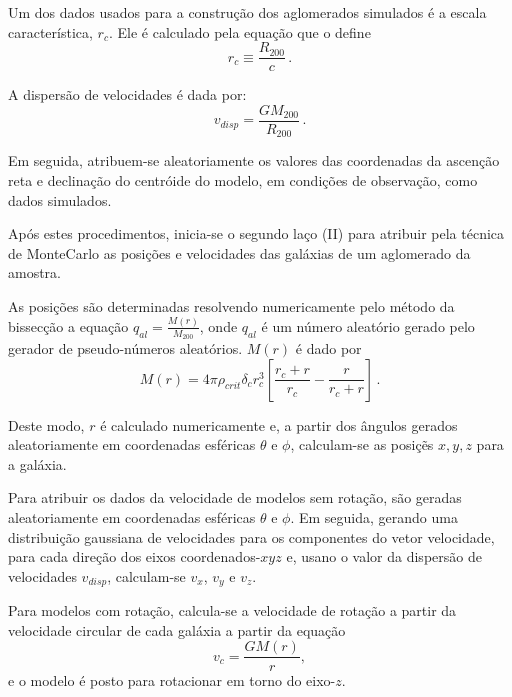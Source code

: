 Um dos dados usados para a constru\c c\~ao dos aglomerados simulados \'e a escala caracter\'istica, $r_c$. Ele \'e calculado pela equa\c c\~ao que o define
\begin{equation}
r_c \equiv \frac{R_{200}}{c} \, .
\label{rc}
\end{equation}	

A dispers\~ao de velocidades \'e dada por:
\begin{equation}
v_{disp} = \frac{GM_{200}}{R_{200}} \, .	
\label{vdisp}
\end{equation}
	
Em seguida, atribuem-se aleatoriamente os valores das coordenadas da ascen\c c\~ao reta e declina\c c\~ao do centr\'oide do modelo, em condi\c c\~oes de observa\c c\~ao, como dados simulados. 


Ap\'os estes procedimentos, inicia-se o segundo la\c co (II) para atribuir pela t\'ecnica de MonteCarlo as posi\c c\~oes e velocidades das gal\'axias de um aglomerado da amostra. 

As posi\c c\~oes s\~ao determinadas resolvendo numericamente pelo m\'etodo da bissec\c c\~ao a equa\c c\~ao $q_{al} = \frac{M(r)}{M_{200}}$, onde $q_{al}$ \'e um n\'umero aleat\'orio gerado pelo gerador de pseudo-n\'umeros aleat\'orios. $M(r)$ \'e dado por
\begin{equation}
M(r)= 4 \pi \rho_{crit} \delta_c r_c^3 \left[ \frac{r_c + r}{r_c} - \frac{r}{r_c+r}  \right] \, .
\label{nfw2}
\end{equation}

Deste modo, $r$ \'e calculado  numericamente e, a partir dos \^angulos gerados aleatoriamente em coordenadas esf\'ericas $\theta$ e $\phi$, calculam-se as posi\c c\~es $x,y,z$ para a gal\'axia.



Para atribuir os dados da velocidade de modelos sem rota\c c\~ao, s\~ao geradas aleatoriamente em coordenadas esf\'ericas $\theta$ e $\phi$. Em seguida, gerando uma distribui\c c\~ao gaussiana de velocidades para os componentes do vetor velocidade, para cada dire\c c\~ao dos eixos coordenados-$xyz$ e, usano o valor da dispers\~ao de velocidades $v_{disp}$, calculam-se $v_x$, $v_y$ e $v_z$. 

Para modelos com rota\c c\~ao, calcula-se a velocidade de rota\c c\~ao a partir da velocidade circular de cada gal\'axia a partir da equa\c c\~ao 
\begin{equation}
v_{c} = \frac{G M(r)}{r},
\label{vcirc}
\end{equation}	
e o modelo \'e posto para rotacionar em torno do eixo-$z$.

